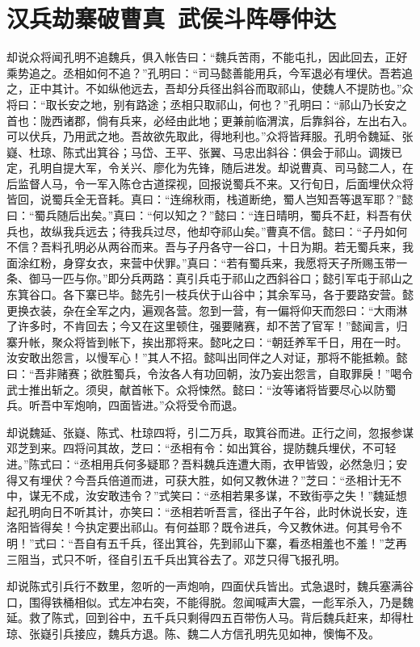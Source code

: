 \chapter{汉兵劫寨破曹真~武侯斗阵辱仲达}

却说众将闻孔明不追魏兵，俱入帐告曰：“魏兵苦雨，不能屯扎，因此回去，正好乘势追之。丞相如何不追？”孔明曰：“司马懿善能用兵，今军退必有埋伏。吾若追之，正中其计。不如纵他远去，吾却分兵径出斜谷而取祁山，使魏人不提防也。”众将曰：“取长安之地，别有路途；丞相只取祁山，何也？”孔明曰：“祁山乃长安之首也：陇西诸郡，倘有兵来，必经由此地；更兼前临渭滨，后靠斜谷，左出右入。可以伏兵，乃用武之地。吾故欲先取此，得地利也。”众将皆拜服。孔明令魏延、张嶷、杜琼、陈式出箕谷；马岱、王平、张翼、马忠出斜谷：俱会于祁山。调拨已定，孔明自提大军，令关兴、廖化为先锋，随后进发。却说曹真、司马懿二人，在后监督人马，令一军入陈仓古道探视，回报说蜀兵不来。又行旬日，后面埋伏众将皆回，说蜀兵全无音耗。真曰：“连绵秋雨，栈道断绝，蜀人岂知吾等退军耶？”懿曰：“蜀兵随后出矣。”真曰：“何以知之？”懿曰：“连日晴明，蜀兵不赶，料吾有伏兵也，故纵我兵远去；待我兵过尽，他却夺祁山矣。”曹真不信。懿曰：“子丹如何不信？吾料孔明必从两谷而来。吾与子丹各守一谷口，十日为期。若无蜀兵来，我面涂红粉，身穿女衣，来营中伏罪。”真曰：“若有蜀兵来，我愿将天子所赐玉带一条、御马一匹与你。”即分兵两路：真引兵屯于祁山之西斜谷口；懿引军屯于祁山之东箕谷口。各下寨已毕。懿先引一枝兵伏于山谷中；其余军马，各于要路安营。懿更换衣装，杂在全军之内，遍观各营。忽到一营，有一偏将仰天而怨曰：“大雨淋了许多时，不肯回去；今又在这里顿住，强要赌赛，却不苦了官军！”懿闻言，归寨升帐，聚众将皆到帐下，挨出那将来。懿叱之曰：“朝廷养军千日，用在一时。汝安敢出怨言，以慢军心！”其人不招。懿叫出同伴之人对证，那将不能抵赖。懿曰：“吾非赌赛；欲胜蜀兵，令汝各人有功回朝，汝乃妄出怨言，自取罪戾！”喝令武士推出斩之。须臾，献首帐下。众将悚然。懿曰：“汝等诸将皆要尽心以防蜀兵。听吾中军炮响，四面皆进。”众将受令而退。

却说魏延、张嶷、陈式、杜琼四将，引二万兵，取箕谷而进。正行之间，忽报参谋邓芝到来。四将问其故，芝曰：“丞相有令：如出箕谷，提防魏兵埋伏，不可轻进。”陈式曰：“丞相用兵何多疑耶？吾料魏兵连遭大雨，衣甲皆毁，必然急归；安得又有埋伏？今吾兵倍道而进，可获大胜，如何又教休进？”芝曰：“丞相计无不中，谋无不成，汝安敢违令？”式笑曰：“丞相若果多谋，不致街亭之失！”魏延想起孔明向日不听其计，亦笑曰：“丞相若听吾言，径出子午谷，此时休说长安，连洛阳皆得矣！今执定要出祁山。有何益耶？既令进兵，今又教休进。何其号令不明！”式曰：“吾自有五千兵，径出箕谷，先到祁山下寨，看丞相羞也不羞！”芝再三阻当，式只不听，径自引五千兵出箕谷去了。邓芝只得飞报孔明。

却说陈式引兵行不数里，忽听的一声炮响，四面伏兵皆出。式急退时，魏兵塞满谷口，围得铁桶相似。式左冲右突，不能得脱。忽闻喊声大震，一彪军杀入，乃是魏延。救了陈式，回到谷中，五千兵只剩得四五百带伤人马。背后魏兵赶来，却得杜琼、张嶷引兵接应，魏兵方退。陈、魏二人方信孔明先见如神，懊悔不及。

